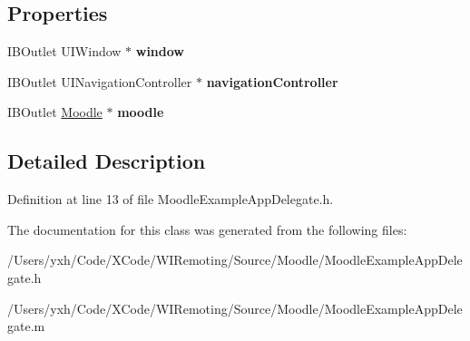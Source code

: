 \subsection*{Properties}
\begin{DoxyCompactItemize}
\item 
\hypertarget{interface_moodle_example_app_delegate_a28d29ba0ffa97e9508d5a480903d5e75}{
IBOutlet UIWindow $\ast$ {\bfseries window}}
\label{interface_moodle_example_app_delegate_a28d29ba0ffa97e9508d5a480903d5e75}

\item 
\hypertarget{interface_moodle_example_app_delegate_a1142f9145b2dff597e9c8f8c0fb97c40}{
IBOutlet UINavigationController $\ast$ {\bfseries navigationController}}
\label{interface_moodle_example_app_delegate_a1142f9145b2dff597e9c8f8c0fb97c40}

\item 
\hypertarget{interface_moodle_example_app_delegate_ad8c096b3a49ece90e2f391d2acb92280}{
IBOutlet \hyperlink{interface_moodle}{Moodle} $\ast$ {\bfseries moodle}}
\label{interface_moodle_example_app_delegate_ad8c096b3a49ece90e2f391d2acb92280}

\end{DoxyCompactItemize}


\subsection{Detailed Description}


Definition at line 13 of file MoodleExampleAppDelegate.h.

The documentation for this class was generated from the following files:\begin{DoxyCompactItemize}
\item 
/Users/yxh/Code/XCode/WIRemoting/Source/Moodle/MoodleExampleAppDelegate.h\item 
/Users/yxh/Code/XCode/WIRemoting/Source/Moodle/MoodleExampleAppDelegate.m\end{DoxyCompactItemize}
